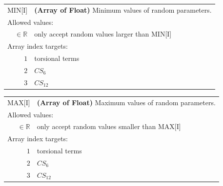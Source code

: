 \documentclass[10pt,a4paper,openany]{memoir}
\numberwithin{equation}{section}
\begin{document}
{
\begin{tabular}{r@{ : }l}
\label{descr:min}
       MIN[I]&\textbf{(Array of Float)} Minimum values of random parameters.                                                       \\ 
\multicolumn{2}{l}{Allowed values:} \\ 
\(\in\mathbb{R}\)&only accept random values larger than MIN[I]                                                                          \\ 
\multicolumn{2}{l}{Array index targets:} \\ 
     \(1\)&torsional terms                                                                                      \\ 
     \(2\)&$CS_6$                                                                                               \\ 
     \(3\)&$CS_{12}$                                                                                            \\ 
\end{tabular}
\vspace{1ex}
}

{
\begin{tabular}{r@{ : }l}
\label{descr:max}
       MAX[I]&\textbf{(Array of Float)} Maximum values of random parameters.                                                       \\ 
\multicolumn{2}{l}{Allowed values:} \\ 
\(\in\mathbb{R}\)&only accept random values smaller than MAX[I]                                                                          \\ 
\multicolumn{2}{l}{Array index targets:} \\ 
     \(1\)&torsional terms                                                                                      \\ 
     \(2\)&$CS_6$                                                                                               \\ 
     \(3\)&$CS_{12}$                                                                                            \\ 
\end{tabular}
\vspace{1ex}
}
\end{document}
